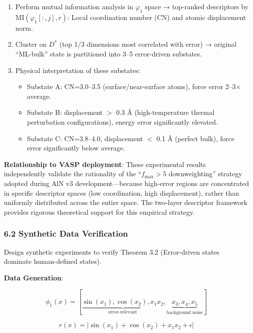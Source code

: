 \documentclass[
  12pt,
]{article}
\providecommand{\tightlist}{%
  \setlength{\itemsep}{0pt}\setlength{\parskip}{0pt}}
\begin{document}
\begin{enumerate}
\def\labelenumi{\arabic{enumi}.}
\tightlist
\item
  Perform mutual information analysis in $\varphi_1$ space → top-ranked descriptors by $\text{MI}(\varphi_1[:, j], r)$: Local coordination number (CN) and atomic displacement norm.
\item
  Cluster on $D^*$ (top 1/3 dimensions most correlated with error) → original ``ML-bulk'' state is partitioned into 3--5 error-driven substates.
\item
  Physical interpretation of these substates:

  \begin{itemize}
  \tightlist
  \item
    Substate A: CN=3.0--3.5 (surface/near-surface atoms), force error 2--3$\times$ average.
  \item
    Substate B: displacement $>$ 0.3 Å (high-temperature thermal perturbation configurations), energy error significantly elevated.
  \item
    Substate C: CN=3.8--4.0, displacement $<$ 0.1 Å (perfect bulk), force error significantly below average.
  \end{itemize}
\end{enumerate}

\textbf{Relationship to VASP deployment}: These experimental results independently validate the rationality of the ``$f_{\max}>5$ downweighting'' strategy adopted during AlN v3 development---because high-error regions are concentrated in specific descriptor spaces (low coordination, high displacement), rather than uniformly distributed across the entire space. The two-layer descriptor framework provides rigorous theoretical support for this empirical strategy.

\subsubsection{6.2 Synthetic Data Verification}\label{synthetic-data-verification}

Design synthetic experiments to verify Theorem 3.2 (Error-driven states dominate human-defined states).

\textbf{Data Generation}:

\[\phi_1(x) = [\underbrace{\sin(x_1), \cos(x_2), x_1 x_2}_{\text{error-relevant}}, \underbrace{x_3, x_4, x_5}_{\text{background noise}}]\]

\[r(x) = |\sin(x_1) + \cos(x_2) + x_1 x_2 + \epsilon|\]
\end{document}
